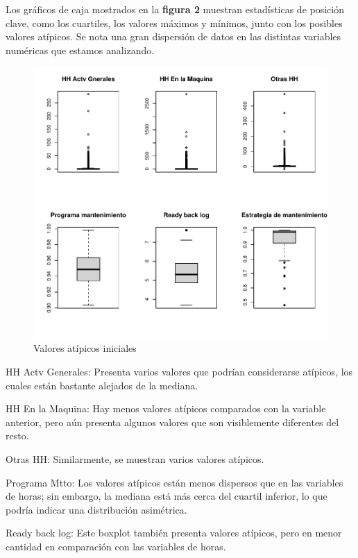 \documentclass[
  11pt,
  bookmarksnumbered]{article}
\begin{document}
Los gráficos de caja mostrados en la \textbf{figura 2} muestran estadísticas de posición clave, como los cuartiles, los valores máximos y mínimos, junto con los posibles valores atípicos.
Se nota una gran dispersión de datos en las distintas variables numéricas que estamos analizando.

\begin{figure}
\centering
\includegraphics{trabajo_files/figure-latex/unnamed-chunk-8-1.pdf}
\caption{\label{fig:unnamed-chunk-8}Valores atípicos iniciales}
\end{figure}

HH Actv Generales: Presenta varios valores que podrían considerarse atípicos, los cuales están bastante alejados de la mediana.

HH En la Maquina: Hay menos valores atípicos comparados con la variable anterior, pero aún presenta algunos valores que son visiblemente diferentes del resto.

Otras HH: Similarmente, se muestran varios valores atípicos.

Programa Mtto: Los valores atípicos están menos dispersos que en las variables de horas; sin embargo, la mediana está más cerca del cuartil inferior, lo que podría indicar una distribución asimétrica.

Ready back log: Este boxplot también presenta valores atípicos, pero en menor cantidad en comparación con las variables de horas.
\end{document}
